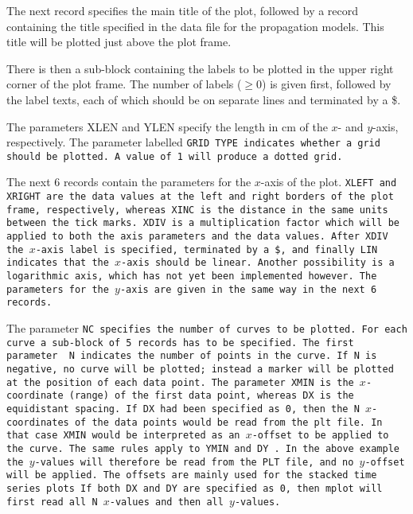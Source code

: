 The next record specifies the main title of the plot, followed by a record
containing the title specified in the data file for the propagation
models. 
This title will be plotted just above the plot frame.

There is then a sub-block containing the labels to be plotted in the upper right
corner of the plot frame. The number of labels ($\geq 0$) is given first, 
followed by the label texts, each of which should be on separate lines and 
terminated by a \$.

The parameters XLEN and YLEN specify the length in cm of the $x$- and $y$-axis,
respectively. The parameter labelled \tt GRID TYPE \rm indicates whether a
grid should be plotted. A value of 1 will produce a dotted grid.

The next 6 records contain the parameters for the $x$-axis of the
plot. \tt XLEFT \rm
and \tt XRIGHT \rm are the data values at the left and right borders of the plot frame,
respectively, whereas \tt XINC \rm is the distance in the same units between the
tick marks. \tt XDIV \rm is a multiplication factor which will be applied to both the
axis parameters and the data values. After \tt XDIV \rm the $x$-axis label is specified,
terminated by a \$, and finally \tt LIN \rm indicates that the $x$-axis should be linear.
Another possibility is a logarithmic axis, which has not yet been implemented 
however. The parameters for the $y$-axis are given in the same way in the next 6
records. 

The parameter \tt NC \rm specifies the number of curves to be plotted. For each curve
a sub-block of 5 records has to be specified. The first parameter \tt
N \rm indicates
the number of points in the curve. If \tt N \rm is negative, no curve will be plotted; 
instead a marker will be plotted at the position of each data point. The 
parameter \tt XMIN \rm  is the $x$-coordinate (range) of the first data point, whereas 
\tt DX \rm is the equidistant spacing. If \tt DX \rm had been
specified as 0, then the 
\tt N \rm $x$-coordinates of the data points would be read from the
\tt plt \rm file. In that
case \tt XMIN \rm would be interpreted as an $x$-offset to be applied to the curve. The
same rules apply to \tt YMIN \rm  and \tt DY \rm. In the above example the $y$-values  will therefore be read from the PLT file, and no $y$-offset will be
applied. The offsets are mainly used for the stacked time series plots
If both \tt DX \rm  and \tt DY \rm are specified
as 0, then \tt mplot \rm will first read all \tt N \rm  $x$-values and
then all $y$-values. 

